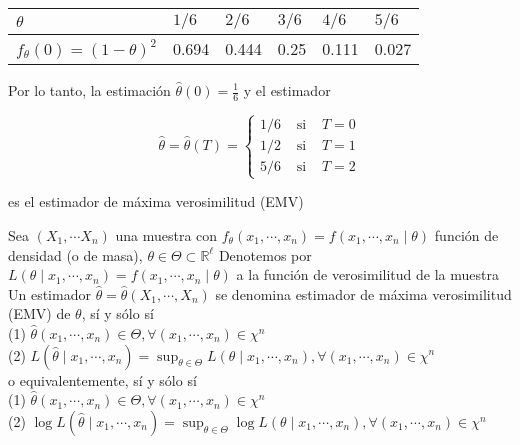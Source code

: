 \begin{center}
  \begin{tabular}{|l|l|l|l|l|l|}
    \hline
    $\theta$                       & $1 / 6$ & $2 / 6$ & $3 / 6$ & $4 / 6$ & $5 / 6$ \\
    \hline
    $f_{\theta}(0)=(1-\theta)^{2}$ & 0.694   & 0.444   & 0.25    & 0.111   & 0.027   \\
    \hline
  \end{tabular}
\end{center}

Por lo tanto, la estimación $\hat{\theta}(0)=\frac{1}{6}$ y el estimador

$$
  \hat{\theta}=\hat{\theta}(T)=\left\{\begin{array}{lll}
    1 / 6 & \text { si } & T=0 \\
    1 / 2 & \text { si } & T=1 \\
    5 / 6 & \text { si } & T=2
  \end{array}\right.
$$

es el estimador de máxima verosimilitud (EMV)

Sea $\left(X_{1}, \cdots X_{n}\right)$ una muestra con $f_{\theta}\left(x_{1},
  \cdots, x_{n}\right)=f\left(x_{1}, \cdots, x_{n} \mid \theta\right)$ función de
densidad (o de masa), $\theta \in \Theta \subset \mathbb{R}^{\ell}$ Denotemos
por $L\left(\theta \mid x_{1}, \cdots, x_{n}\right)=f\left(x_{1}, \cdots, x_{n}
  \mid \theta\right)$ a la función de verosimilitud de la muestra Un estimador
$\hat{\theta}=\hat{\theta}\left(X_{1}, \cdots, X_{n}\right)$ se denomina
estimador de máxima verosimilitud (EMV) de $\theta$, sí y sólo sí\\ (1)
$\hat{\theta}\left(x_{1}, \cdots, x_{n}\right) \in \Theta, \forall\left(x_{1},
  \cdots, x_{n}\right) \in \chi^{n}$\\ (2) $L\left(\hat{\theta} \mid x_{1},
  \cdots, x_{n}\right)=\sup _{\theta \in \Theta} L\left(\theta \mid x_{1},
  \cdots, x_{n}\right), \forall\left(x_{1}, \cdots, x_{n}\right) \in \chi^{n}$\\
o equivalentemente, sí y sólo sí\\ (1) $\hat{\theta}\left(x_{1}, \cdots,
  x_{n}\right) \in \Theta, \forall\left(x_{1}, \cdots, x_{n}\right) \in
  \chi^{n}$\\ (2) $\log L\left(\hat{\theta} \mid x_{1}, \cdots, x_{n}\right)=\sup
  _{\theta \in \Theta} \log L\left(\theta \mid x_{1}, \cdots, x_{n}\right),
  \forall\left(x_{1}, \cdots, x_{n}\right) \in \chi^{n}$

